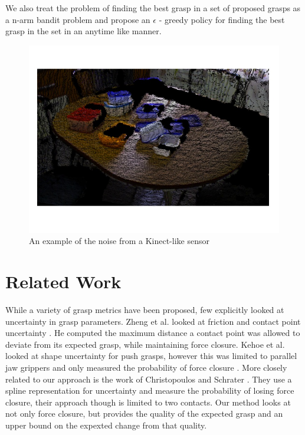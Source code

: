 \documentclass[letterpaper, 10 pt, conference]{ieeeconf}  %
\begin{document}
We also treat the problem of finding the best grasp in a set of proposed grasps as a n-arm bandit problem and propose an $\epsilon$ - greedy policy for finding the best grasp in the set in an anytime like manner. 

\begin{figure}[ht!]
\centering
\includegraphics[scale = 0.3]{figures/Slide02.jpg}
\caption{An example of the noise from a Kinect-like sensor}
\vspace*{-10pt}
\label{fig:noisy data}
\end{figure}


\section{Related Work}

While a variety of grasp metrics have been proposed, few explicitly looked at uncertainty in grasp parameters. Zheng et al. looked at friction and contact point uncertainty \cite{zheng2005}. He computed the maximum distance a contact point was allowed to deviate from its expected grasp, while maintaining force closure. Kehoe et al. looked at shape uncertainty for push grasps, however this was limited to parallel jaw grippers and only measured the probability of force closure \cite{kehoe2012toward}. More closely related to our approach is the work of Christopoulos and Schrater \cite{christopoulos2007handling}. They use a spline representation for uncertainty and measure the probability of losing force closure, their approach though is limited to two contacts. Our method looks at not only force closure, but provides the quality of the expected grasp and an upper bound on the expexted change from that quality. 
\end{document}
